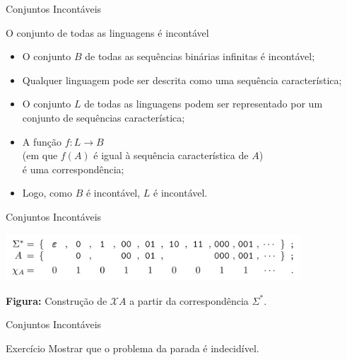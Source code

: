 \documentclass[xcolor=dvipsnames,table]{beamer}
\begin{document}
	\begin{frame}{Conjuntos Incontáveis}
		\begin{block}{O conjunto de todas as linguagens é incontável}
			\begin{itemize}
				\item O conjunto $B$ de todas as sequências binárias infinitas é incontável;
				\item Qualquer linguagem pode ser descrita como uma sequência característica;
				\item O conjunto $L$ de todas as linguagens podem ser representado por um conjunto de sequências característica;
				\item A função $f : L \rightarrow B$ \\(em que $f(A)$ é igual à sequência característica de $A$) \\é uma correspondência;
				\item Logo, como $B$ é incontável, $L$ é incontável.
			\end{itemize}
		\end{block}
	\end{frame}
	
	\begin{frame}{Conjuntos Incontáveis}
		\begin{center}
			\includegraphics[width=11cm]{images/seqCar.png}
			
			{\bf Figura:} Construção de $\mathcal{X}A$ a partir da correspondência $\Sigma^*$.
		\end{center}
	\end{frame}
	
	\begin{frame}{Conjuntos Incontáveis}
		\begin{block}{Exercício}
			Mostrar que o problema da parada é indecidível.
		\end{block}
	\end{frame}
	
	\begin{frame}
		\titlepage
	\end{frame}
	
\end{document}
